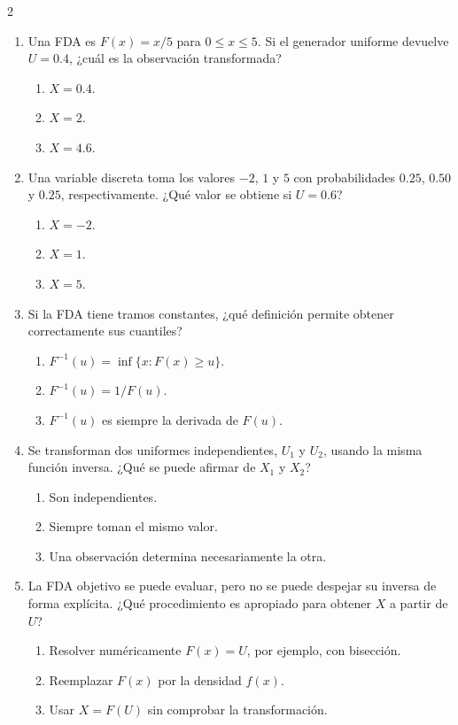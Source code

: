 \documentclass[11pt]{article}
\begin{document}
\begin{multicols}{2}
\begin{enumerate}
    \item Una FDA es $F(x)=x/5$ para $0\leq x\leq5$. Si el generador uniforme
    devuelve $U=0.4$, ¿cuál es la observación transformada?
    \begin{enumerate}
        \item $X=0.4$.
        \item $X=2$.
        \item $X=4.6$.
    \end{enumerate}

    \item Una variable discreta toma los valores $-2$, $1$ y $5$ con
    probabilidades $0.25$, $0.50$ y $0.25$, respectivamente. ¿Qué valor se
    obtiene si $U=0.6$?
    \begin{enumerate}
        \item $X=-2$.
        \item $X=1$.
        \item $X=5$.
    \end{enumerate}

    \item Si la FDA tiene tramos constantes, ¿qué definición permite obtener
    correctamente sus cuantiles?
    \begin{enumerate}
        \item $F^{-1}(u)=\inf\{x:F(x)\geq u\}$.
        \item $F^{-1}(u)=1/F(u)$.
        \item $F^{-1}(u)$ es siempre la derivada de $F(u)$.
    \end{enumerate}

    \item Se transforman dos uniformes independientes, $U_1$ y $U_2$, usando
    la misma función inversa. ¿Qué se puede afirmar de $X_1$ y $X_2$?
    \begin{enumerate}
        \item Son independientes.
        \item Siempre toman el mismo valor.
        \item Una observación determina necesariamente la otra.
    \end{enumerate}

    \item La FDA objetivo se puede evaluar, pero no se puede despejar su inversa
    de forma explícita. ¿Qué procedimiento es apropiado para obtener $X$ a
    partir de $U$?
    \begin{enumerate}
        \item Resolver numéricamente $F(x)=U$, por ejemplo, con bisección.
        \item Reemplazar $F(x)$ por la densidad $f(x)$.
        \item Usar $X=F(U)$ sin comprobar la transformación.
    \end{enumerate}


\end{enumerate}
\end{multicols}
\end{document}
